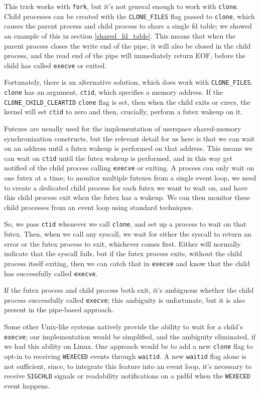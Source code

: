 \documentclass[letterpaper,twocolumn,10pt]{article}
\begin{document}
This trick works with \texttt{fork},
but it's not general enough to work with \texttt{clone}.
Child processes can be created with the \verb|CLONE_FILES| flag passed to \texttt{clone},
which causes the parent process and child process to share a single fd table;
we showed an example of this in section \ref{shared_fd_table}.
This means that when the parent process closes the write end of the pipe,
it will also be closed in the child process,
and the read end of the pipe will immediately return EOF,
before the child has called \texttt{execve} or exited.

Fortunately, there is an alternative solution, which does work with \verb|CLONE_FILES|.
\texttt{clone} has an argument, \texttt{ctid}, which specifies a memory address.
If the \verb|CLONE_CHILD_CLEARTID| \texttt{clone} flag is set,
then when the child exits or execs,
the kernel will set \texttt{ctid} to zero and then,
crucially, perform a futex wakeup on it.

Futexes are usually used for the implementation of userspace shared-memory synchronization constructs,
but the relevant detail for us here is that we can wait on an address
until a futex wakeup is performed on that address.
This means we can wait on \texttt{ctid} until the futex wakeup is performed,
and in this way get notified of the child process calling \texttt{execve} or exiting.
A process can only wait on one futex at a time;
to monitor multiple futexes from a single event loop,
we need to create a dedicated child process for each futex we want to wait on,
and have this child process exit when the futex has a wakeup.
We can then monitor these child processes from an event loop using standard techniques.\cite{signalfd}\cite{pidfd}

So, we pass \texttt{ctid} whenever we call \texttt{clone},
and set up a process to wait on that futex.
Then, when we call any syscall,
we wait for either the syscall to return an error or the futex process to exit,
whichever comes first.
Either will normally indicate that the syscall fails,
but if the futex process exits,
without the child process itself exiting,
then we can catch that in \texttt{execve} and know that the child has successfully called \texttt{execve}.

If the futex process and child process both exit,
it's ambiguous whether the child process successfully called \texttt{execve};
this ambiguity is unfortunate, but it is also present in the pipe-based approach.

Some other Unix-like systems natively provide the ability to wait for a child's \texttt{execve};
our implementation would be simplified, and the ambiguity eliminated,
if we had this ability on Linux.\cite{freebsd_kqueue}
One approach would be to add a new \texttt{clone} flag to
opt-in to receiving \texttt{WEXECED} events through \texttt{waitid}.
A new \texttt{waitid} flag alone is not sufficient,
since, to integrate this feature into an event loop,
it's necessary to receive \texttt{SIGCHLD} signals or readability notifications on a pidfd
when the \texttt{WEXECED} event happens.
\end{document}

